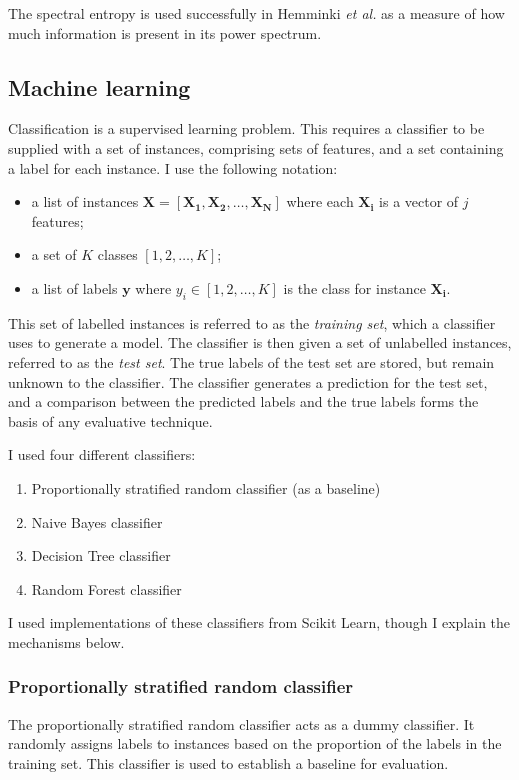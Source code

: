         The spectral entropy is used successfully in Hemminki \emph{et al.}\cite{hemminki2013accelerometer} as a measure of how much information is present in its power spectrum.
    \subsection{Machine learning}
      Classification is a supervised learning problem. This requires a classifier to be supplied with a set of instances, comprising sets of features, and a set containing a label for each instance. I use the following notation:
      \begin{itemize}
        \item a list of instances $\mathbf{X} = \left[\mathbf{X_1}, \mathbf{X_2}, \dots, \mathbf{X_N}\right]$ where each $\mathbf{X_i}$ is a vector of $j$ features;
        \item a set of $K$ classes $\left[1, 2, \dots, K\right]$;
        \item a list of labels $\mathbf{y}$ where $y_i \in \left[1, 2, \dots, K\right]$ is the class for instance $\mathbf{X_i}$.
      \end{itemize}  
      
      This set of labelled instances is referred to as the \emph{training set}, which a classifier uses to generate a model. The classifier is then given a set of unlabelled instances, referred to as the \emph{test set}. The true labels of the test set are stored, but remain unknown to the classifier. The classifier generates a prediction for the test set, and a comparison between the predicted labels and the true labels forms the basis of any evaluative technique.
      
      I used four different classifiers:
      \begin{enumerate}
        \item Proportionally stratified random classifier (as a baseline)
        \item Naive Bayes classifier
        \item Decision Tree classifier
        \item Random Forest classifier
      \end{enumerate}
      
      I used implementations of these classifiers from Scikit Learn, though I explain the mechanisms below.
      
      \subsubsection{Proportionally stratified random classifier}
        The proportionally stratified random classifier acts as a dummy classifier. It randomly assigns labels to instances based on the proportion of the labels in the training set. This classifier is used to establish a baseline for evaluation.
        
